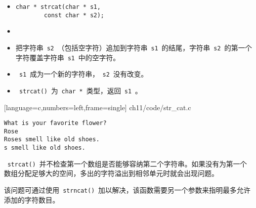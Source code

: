\begin{frame}[fragile]
  \begin{itemize}
    \item {}
      \begin{lstlisting}[backgroundcolor=\color{red!20}]
char * strcat(char * s1, 
        const char * s2);
      \end{lstlisting}
    \item {}
    \item[] 把字符串\lstinline| s2 |（包括空字符）追加到字符串\lstinline| s1 |的结尾，字符串\lstinline| s2 |的第一个字符覆盖字符串\lstinline| s1 |中的空字符。
    \end{itemize}
\end{frame}

\begin{frame}[fragile] 
  \begin{itemize}
    \item
      \lstinline| s1 |成为一个新的字符串，\lstinline| s2 |没有改变。\\[0.1in]
    \item 
      \lstinline| strcat() |为\lstinline| char * |类型，返回\lstinline| s1 |。
    \end{itemize}
\end{frame}

\begin{frame}

[language=c,numbers=left,frame=single]
{ch11/code/str_cat.c}
\end{frame}

\begin{frame}[fragile]
\begin{lstlisting}[backgroundcolor=\color{blue!20}]
What is your favorite flower?
Rose
Roses smell like old shoes.
s smell like old shoes.
\end{lstlisting}
\end{frame}

\begin{frame}[fragile] 
\lstinline| strcat() |并不检查第一个数组是否能够容纳第二个字符串。如果没有为第一个数组分配足够大的空间，多出的字符溢出到相邻单元时就会出现问题。\vspace{.1in}

该问题可通过使用\lstinline| strncat() |加以解决，该函数需要另一个参数来指明最多允许添加的字符数目。


\end{frame}

